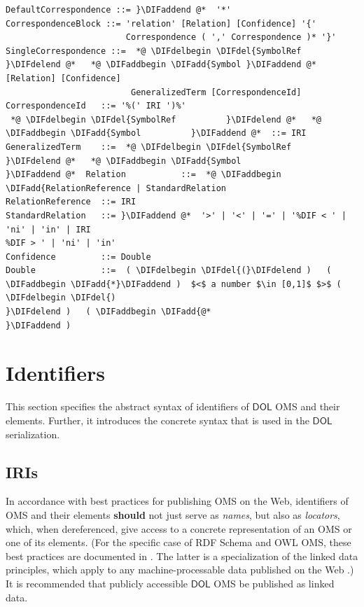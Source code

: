 \documentclass[10pt,fleqn,final]{scrreprt}
\makeatletter
\newcommand*\CommentAuthor{}
\renewcommand*\CommentAuthor{#1}}
\newcommand*\CommentDate{}
\renewcommand*\CommentDate{#1}}
\newcommand*\CommentId{}
\renewcommand*\CommentId{#1}}
\newcommand*\CommentType{}
\renewcommand*\CommentType{#1}}
\newcommand*{\SetCommentColorByType}[1]{%
\edef\localType{{#1}}%
\expandafter\ifstrequal\localType{q-aut}{\colorlet{CommentColor}{red}}{%
\expandafter\ifstrequal\localType{q-all}{\colorlet{CommentColor}{orange}}{%
\expandafter\ifstrequal\localType{todo}{\colorlet{CommentColor}{orange}}{%
\expandafter\ifstrequal\localType{fyi}{\colorlet{CommentColor}{lightgray}}{%
\colorlet{CommentColor}{yellow}}}}}}
\newcommand*{\SetCommentPrefixByType}[1]{%
\edef\localType{{#1}}%
\expandafter\@ifmtarg\localType{%
\edef\CommentPrefix{}%
}{%
\caseupper[q]{#1}%
\edef\CommentPrefix{\thestring: }%
}}
\newcommand*{\initComment}[1]{%
\setkeys{Comment}{#1}%
\SetCommentColorByType{\CommentType}%
\relax%
\SetCommentPrefixByType{\CommentType}%
\relax%
}
\newcommand*{\todonote}[2][]{%
\initComment{#1}%
\pdfcomment[author=\CommentAuthor,color=CommentColor,date=\CommentDate,id=\CommentId]{%
\CommentPrefix
#2}}
\renewcommand*{\todonote}[2][]{%
\initComment{#1}%
\ednote{\CommentPrefix #2}}
\newcommand*{\CLnote}[2][author=Christoph Lange]{%
\todonote[author=Christoph Lange,#1]{#2} 
}
\newcommand*{\should}{\textbf{should}\xspace}
\newcommand*{\DOL}{\ensuremath{\mathsf{DOL}}\xspace}
\newcommand{\sclause}[1]{\section{#1}}
\newcommand{\ssclause}[1]{\subsection{#1}}
\providecommand{\DIFadd}[1]{{\protect\color{blue}\uwave{#1}}} %
\providecommand{\DIFdel}[1]{{\protect\color{red}\sout{#1}}}                      %
\providecommand{\DIFaddbegin}{} %
\providecommand{\DIFaddend}{} %
\providecommand{\DIFdelbegin}{} %
\providecommand{\DIFdelend}{} %
\makeatother
\begin{document}
\begin{lstlisting}[language=ebnf,mathescape]
DefaultCorrespondence ::= }\DIFaddend @*  '*' 
CorrespondenceBlock ::= 'relation' [Relation] [Confidence] '{'
                        Correspondence ( ',' Correspondence )* '}'
SingleCorrespondence ::=  *@ \DIFdelbegin \DIFdel{SymbolRef }\DIFdelend @*   *@ \DIFaddbegin \DIFadd{Symbol }\DIFaddend @*  [Relation] [Confidence]
                         GeneralizedTerm [CorrespondenceId]
CorrespondenceId   ::= '%(' IRI ')%'
 *@ \DIFdelbegin \DIFdel{SymbolRef          }\DIFdelend @*   *@ \DIFaddbegin \DIFadd{Symbol          }\DIFaddend @*  ::= IRI
GeneralizedTerm    ::=  *@ \DIFdelbegin \DIFdel{SymbolRef
}\DIFdelend @*   *@ \DIFaddbegin \DIFadd{Symbol
}\DIFaddend @*  Relation           ::=  *@ \DIFaddbegin \DIFadd{RelationReference | StandardRelation
RelationReference  ::= IRI
StandardRelation   ::= }\DIFaddend @*  '>' | '<' | '=' | '%DIF < ' | 'ni' | 'in' | IRI
%DIF > ' | 'ni' | 'in'
Confidence         ::= Double
Double             ::=  ( \DIFdelbegin \DIFdel{(}\DIFdelend )   ( \DIFaddbegin \DIFadd{*}\DIFaddend )  $<$ a number $\in [0,1]$ $>$ ( \DIFdelbegin \DIFdel{) 
}\DIFdelend )   ( \DIFaddbegin \DIFadd{@*
}\DIFaddend ) 
\end{lstlisting}






\sclause{Identifiers}\label{c:identifiers}
This section specifies the abstract syntax of identifiers of \DOL OMS and their elements. Further, 
it introduces the concrete syntax that is used in the \DOL serialization. 
\DIFdelbegin %

\DIFdelend \ssclause{IRIs}\label{c:iris}


In accordance with best practices for publishing OMS on the Web, identifiers of OMS and their 
elements \should not just serve as \emph{names}, but also as \emph{locators}, which, when 
dereferenced, give access to a concrete representation of an OMS or one of its elements.  (For the 
specific case of RDF Schema and OWL OMS, these best practices are documented in 
\cite{W3C:NOTE-swbp-vocab-pub-20080828}.  The latter is a specialization of the linked data 
principles, which apply to any machine-processable data published on the Web 
\cite{BernersLee:LinkedData2006}.)  It is recommended that publicly accessible \DOL OMS be published 
as linked data.
\end{document}
